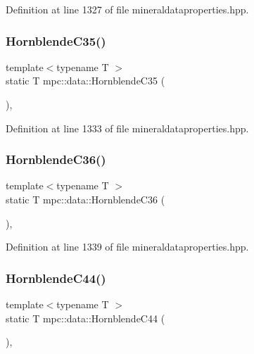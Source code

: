 Definition at line 1327 of file mineraldataproperties.\+hpp.

\mbox{\label{namespacempc_1_1data_a2f318bf2ce6b8bdea77f99f8e20329e8}} 
\subsubsection{\texorpdfstring{Hornblende\+C35()}{HornblendeC35()}}
{\footnotesize\ttfamily template$<$typename T $>$ \\
static T mpc\+::data\+::\+Hornblende\+C35 (\begin{DoxyParamCaption}{ }\end{DoxyParamCaption})\hspace{0.3cm}{\ttfamily [inline]}, {\ttfamily [static]}}



Definition at line 1333 of file mineraldataproperties.\+hpp.

\mbox{\label{namespacempc_1_1data_a58a1073e772be2c543e3a3ce756e08bf}} 
\subsubsection{\texorpdfstring{Hornblende\+C36()}{HornblendeC36()}}
{\footnotesize\ttfamily template$<$typename T $>$ \\
static T mpc\+::data\+::\+Hornblende\+C36 (\begin{DoxyParamCaption}{ }\end{DoxyParamCaption})\hspace{0.3cm}{\ttfamily [inline]}, {\ttfamily [static]}}



Definition at line 1339 of file mineraldataproperties.\+hpp.

\mbox{\label{namespacempc_1_1data_a711981c0ab9a31709771931c708bc731}} 
\subsubsection{\texorpdfstring{Hornblende\+C44()}{HornblendeC44()}}
{\footnotesize\ttfamily template$<$typename T $>$ \\
static T mpc\+::data\+::\+Hornblende\+C44 (\begin{DoxyParamCaption}{ }\end{DoxyParamCaption})\hspace{0.3cm}{\ttfamily [inline]}, {\ttfamily [static]}}



